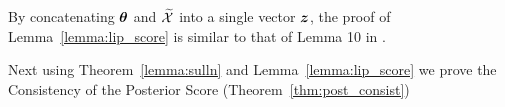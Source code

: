 {By concatenating $\bm{\theta}$ and $\widetilde{\mathcal{X}}$ into a single vector $\bm{z}$,
the proof of Lemma~\ref{lemma:lip_score} 
is similar to that of 
Lemma 10 in \cite{crafts2023bayesian}.
}


{Next using Theorem~\ref{lemma:sulln} and Lemma~\ref{lemma:lip_score} we prove the Consistency of the Posterior Score (Theorem~\ref{thm:post_consist}) }
